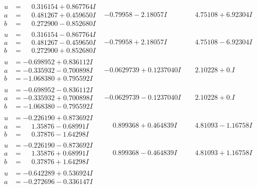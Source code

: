 \documentclass[1p]{elsarticle_modified}
\theoremstyle{definition}
\begin{document}
$$\begin{array}{c|c|c}
\begin{aligned}
u &= \phantom{-}0.316154 + 0.867764 I \\
a &= \phantom{-}0.481267 + 0.459650 I \\
b &= \phantom{-}0.272900 - 0.852680 I\end{aligned}
 & -0.79958 - 2.18057 I & \phantom{-}4.75108 + 6.92304 I \\ \hline\begin{aligned}
u &= \phantom{-}0.316154 - 0.867764 I \\
a &= \phantom{-}0.481267 - 0.459650 I \\
b &= \phantom{-}0.272900 + 0.852680 I\end{aligned}
 & -0.79958 + 2.18057 I & \phantom{-}4.75108 - 6.92304 I \\ \hline\begin{aligned}
u &= -0.698952 + 0.836112 I \\
a &= -0.335932 - 0.700898 I \\
b &= -1.068380 + 0.795592 I\end{aligned}
 & -0.0629739 + 0.1237040 I & \phantom{-}2.10228 + 0. I\phantom{ +0.000000I} \\ \hline\begin{aligned}
u &= -0.698952 - 0.836112 I \\
a &= -0.335932 + 0.700898 I \\
b &= -1.068380 - 0.795592 I\end{aligned}
 & -0.0629739 - 0.1237040 I & \phantom{-}2.10228 + 0. I\phantom{ +0.000000I} \\ \hline\begin{aligned}
u &= -0.226190 + 0.873692 I \\
a &= \phantom{-}1.35876 - 0.68991 I \\
b &= \phantom{-}0.37876 - 1.64298 I\end{aligned}
 & \phantom{-}0.899368 + 0.464839 I & \phantom{-}4.81093 - 1.16758 I \\ \hline\begin{aligned}
u &= -0.226190 - 0.873692 I \\
a &= \phantom{-}1.35876 + 0.68991 I \\
b &= \phantom{-}0.37876 + 1.64298 I\end{aligned}
 & \phantom{-}0.899368 - 0.464839 I & \phantom{-}4.81093 + 1.16758 I \\ \hline\begin{aligned}
u &= -0.642289 + 0.536924 I \\
a &= -0.272696 - 0.336147 I \\

\end{aligned}
\end{array}$$
\end{document}
